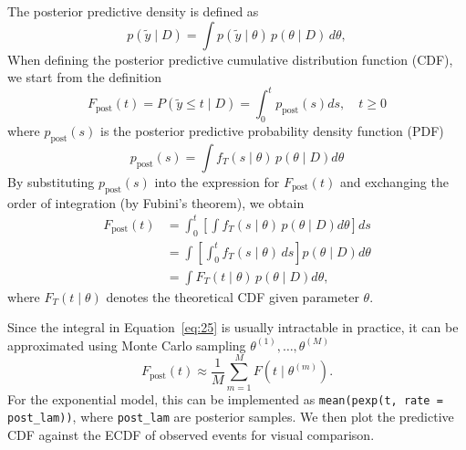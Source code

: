 The posterior predictive density is defined as
\begin{equation}
    p(\tilde{y} \mid D) = \int p(\tilde{y} \mid \theta) \, p(\theta \mid D) \, d\theta,
\end{equation}
When defining the posterior predictive cumulative distribution function (CDF), we start from the definition
\begin{equation}
F_{\text{post}}(t)
= P(\tilde{y} \le t \mid D)
= \int_0^{t} p_{\text{post}}(s) ds, \quad t\ge 0
\end{equation}
where $p_{\text{post}}(s)$ is the posterior predictive probability density function (PDF)
\begin{equation}
p_{\text{post}}(s)
= \int f_T(s\mid\theta)\,p(\theta \mid D) d\theta
\end{equation}
By substituting $p_{\text{post}}(s)$ into the expression for $F_{\text{post}}(t)$ and exchanging the order of integration (by Fubini's theorem), we obtain
\begin{align}
F_{\text{post}}(t)
&= \int_0^{t} 
\left[ \int f_T(s\mid\theta)\,p(\theta \mid D) d\theta \right] ds \\[6pt]
&= \int \left[ \int_0^{t} f_T(s\mid\theta)\, ds \right] p(\theta \mid D) d\theta \\[6pt]
&= \int F_T(t\mid\theta)\, p(\theta \mid D) d\theta,
\label{eq:25}
\end{align}
where $F_T(t\mid\theta)$ denotes the theoretical CDF given parameter $\theta$.

Since the integral in Equation~\eqref{eq:25} is usually intractable in practice, it can be approximated using Monte Carlo sampling $\theta^{(1)}, \dots, \theta^{(M)}$
\begin{equation}
    F_{\text{post}}(t) \approx \frac{1}{M} \sum_{m=1}^M F(t \mid \theta^{(m)}).
\end{equation}
For the exponential model, this can be implemented as \texttt{mean(pexp(t, rate = post\_lam))}, where \texttt{post\_lam} are posterior samples. We then plot the predictive CDF against the ECDF of observed events for visual comparison.
